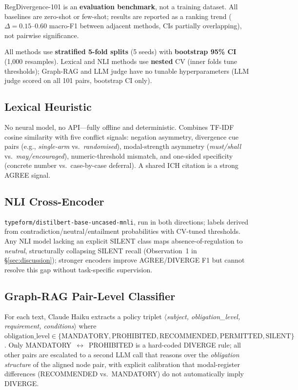 \documentclass[manuscript]{acmart}
\begin{document}
RegDivergence-101 is an \textbf{evaluation benchmark}, not a training dataset.
All baselines are zero-shot or few-shot; results are reported as a ranking trend
($\Delta = 0.15$--$0.60$ macro-F1 between adjacent methods, CIs partially
overlapping), not pairwise significance.

All methods use \textbf{stratified 5-fold splits} (5 seeds) with
\textbf{bootstrap 95\% CI} (1{,}000 resamples). Lexical and NLI methods use
\textbf{nested} CV (inner folds tune thresholds); Graph-RAG and LLM judge have
no tunable hyperparameters (LLM judge scored on all 101 pairs, bootstrap
CI only).

\subsection{Lexical Heuristic}

No neural model, no API---fully offline and deterministic. Combines TF-IDF
cosine similarity with five conflict signals: negation asymmetry, divergence
cue pairs (e.g., \textit{single-arm} vs.\ \textit{randomised}), modal-strength
asymmetry (\textit{must/shall} vs.\ \textit{may/encouraged}),
numeric-threshold mismatch, and one-sided specificity (concrete number
vs.\ case-by-case deferral). A shared ICH citation is a strong AGREE signal.

\subsection{NLI Cross-Encoder}

\texttt{typeform/distilbert-base-uncased-mnli}, run in both directions; labels
derived from contradiction/neutral/entailment probabilities with CV-tuned
thresholds. Any NLI model lacking an explicit SILENT class maps
absence-of-regulation to \textit{neutral}, structurally collapsing SILENT
recall (Observation~1 in \S\ref{sec:discussion}); stronger encoders improve
AGREE/DIVERGE F1 but cannot resolve this gap without task-specific supervision.

\subsection{Graph-RAG Pair-Level Classifier}

For each text, Claude Haiku extracts a policy triplet
$\langle$\textit{subject, obligation\_level, requirement, conditions}$\rangle$
where $\text{obligation\_level} \in \{\text{MANDATORY}, \text{PROHIBITED},
\text{RECOMMENDED}, \text{PERMITTED}, \text{SILENT}\}$. Only
MANDATORY~$\leftrightarrow$~PROHIBITED is a hard-coded DIVERGE rule; all other
pairs are escalated to a second LLM call that reasons over the
\textit{obligation structure} of the aligned node pair, with explicit
calibration that modal-register differences (RECOMMENDED vs.\ MANDATORY) do not
automatically imply DIVERGE.
\end{document}
